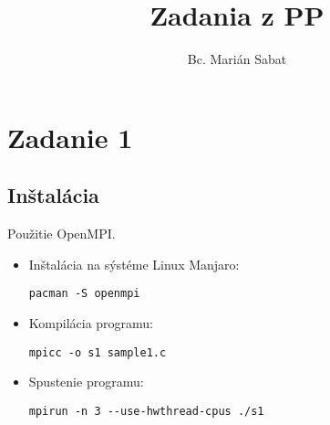 \documentclass{report}
\title{Zadania z PP}
\author{Bc. Marián Sabat}
\begin{document}
\maketitle
\tableofcontents

\chapter{Zadanie 1}
\section{Inštalácia}
Použitie OpenMPI.

\begin{itemize}

\item Inštalácia na sýstéme Linux Manjaro:
\begin{lstlisting}
pacman -S openmpi
\end{lstlisting}

\item Kompilácia programu:
\begin{lstlisting}
mpicc -o s1 sample1.c
\end{lstlisting}

\item Spustenie programu:
\begin{lstlisting}
mpirun -n 3 --use-hwthread-cpus ./s1
\end{lstlisting}

\end{itemize}
\end{document}
